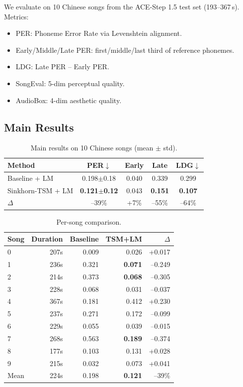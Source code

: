 \documentclass[11pt,a4paper]{article}
\begin{document}
We evaluate on 10 Chinese songs from the ACE-Step 1.5 test set (193--367\,s). Metrics:
\begin{itemize}
    \item PER: Phoneme Error Rate via Levenshtein alignment.
    \item Early/Middle/Late PER: first/middle/last third of reference phonemes.
    \item LDG: Late PER -- Early PER.
    \item SongEval: 5-dim perceptual quality.
    \item AudioBox: 4-dim aesthetic quality.
\end{itemize}

\subsection{Main Results}

\begin{table}[h]
\centering
\caption{Main results on 10 Chinese songs (mean $\pm$ std).}
\label{tab:main}
\begin{tabular}{lcccc}
\toprule
Method & PER$\downarrow$ & Early & Late & LDG$\downarrow$ \\
\midrule
Baseline + LM & 0.198$\pm$0.18 & 0.040 & 0.339 & 0.299 \\
Sinkhorn-TSM + LM & \textbf{0.121$\pm$0.12} & 0.043 & \textbf{0.151} & \textbf{0.107} \\
\midrule
$\Delta$ & --39\% & +7\% & --55\% & --64\% \\
\bottomrule
\end{tabular}
\end{table}

\begin{table}[h]
\centering
\caption{Per-song comparison.}
\label{tab:persong}
\begin{tabular}{lrrrr}
\toprule
Song & Duration & Baseline & TSM+LM & $\Delta$ \\
\midrule
0 & 207s & 0.009 & 0.026 & +0.017 \\
1 & 236s & 0.321 & \textbf{0.071} & --0.249 \\
2 & 214s & 0.373 & \textbf{0.068} & --0.305 \\
3 & 228s & 0.068 & 0.031 & --0.037 \\
4 & 367s & 0.181 & 0.412 & +0.230 \\
5 & 237s & 0.271 & 0.172 & --0.099 \\
6 & 229s & 0.055 & 0.039 & --0.015 \\
7 & 268s & 0.563 & \textbf{0.189} & --0.374 \\
8 & 177s & 0.103 & 0.131 & +0.028 \\
9 & 215s & 0.032 & 0.073 & +0.041 \\
\midrule
Mean & 224s & 0.198 & \textbf{0.121} & --39\% \\
\bottomrule
\end{tabular}
\end{table}
\end{document}

